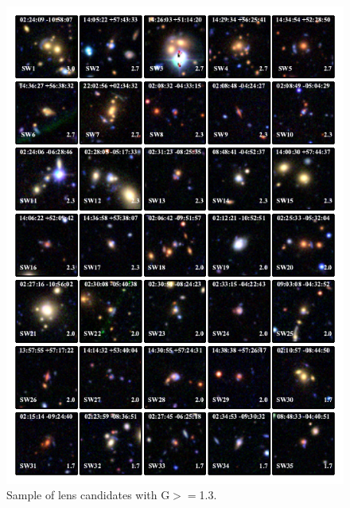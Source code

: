 \documentclass[useAMS,usenatbib,a4paper]{mn2e}
\begin{document}
\twocolumn

\begin{figure}
\begin{center}
\includegraphics[scale=1.9]{sw-cfhtls-figs/lenscandfin.pdf}
\caption{ \label{fig:lc}
Sample of lens candidates with G$>=$1.3.
}
\end{center}
\end{figure}
\end{document}
